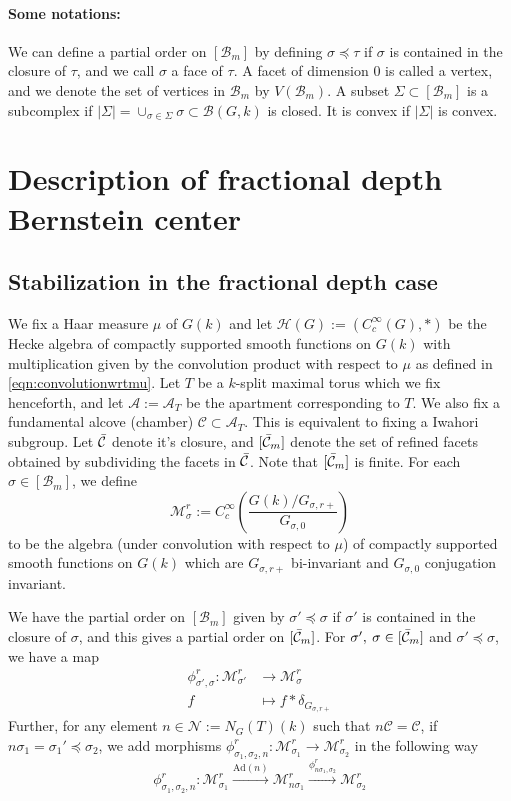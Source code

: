 \documentclass[11 pt]{article}
\numberwithin{equation}{subsection}
\theoremstyle{definition}
\theoremstyle{remark}
\theoremstyle{conjecture}
\newcommand{\sA}{\mathscr A}
\newcommand{\Ad}{\mathrm{Ad}}
\newcommand{\HH}{\mathcal H}
\newcommand{\A}{\mathcal A}
\newcommand{\M}{\mathcal{M}}
\newcommand{\B}{\mathcal{B}}
\newcommand{\mc}{\mathcal}
\newcommand{\mcC}{\mathcal C}
\begin{document}
\paragraph{Some notations:} We can define a partial order on $[\B_m]$ by defining $\sigma \preceq \tau$ if $\sigma $ is contained in the closure of $\tau$, and we call $\sigma$ a face of $\tau$. A facet of dimension $0$ is called a vertex, and we denote the set of vertices in $\B_m$ by $V(\B_m)$. A subset $\Sigma \subset [\B_m]$ is a subcomplex if $|\Sigma|=\cup_{\sigma \in \Sigma}\sigma \subset \B(G,k)$ is closed. It is convex if $|\Sigma|$ is convex.

 
\section{Description of fractional depth Bernstein center }\label{section:fracdepthdescription}
\subsection{Stabilization in the fractional depth case}
 
We fix a Haar measure $\mu$ of $G(k)$ and let $\HH(G):=(C_c^\infty(G),*)$ be the Hecke algebra of compactly supported smooth functions on $G(k)$ with multiplication given by the convolution product with respect to $\mu $ as defined in \eqref{eqn:convolutionwrtmu}. Let $T$ be a $k$-split maximal torus which we fix henceforth, and let $\sA:=\A_T$ be the apartment corresponding to $T$. We also fix a fundamental alcove (chamber) $\mcC \subset \mc A_T$. This is equivalent to fixing a Iwahori subgroup. Let $\Bar{\mcC}$ denote it's closure, and $[\Bar{\mcC}_m]$ denote the set of refined facets obtained by subdividing the facets in $\Bar{\mcC}$. Note that $[\Bar{\mcC}_m]$ is finite. For each $\sigma \in [\B_m]$, we define 
\[
\M_\sigma^r:=C_c^\infty\left(\frac{G(k)/G_{\sigma,r+}}{G_{\sigma,0}}\right)
\]
to be the algebra (under convolution with respect to $\mu$) of compactly supported smooth functions on $G(k)$ which are $G_{\sigma,r+}$ bi-invariant and ${G_{\sigma,0}}$ conjugation invariant. \par
We have the partial order on $[\B_m]$ given by $\sigma' \preceq \sigma $ if $\sigma'$ is contained in the closure of $\sigma$, and this gives a partial order on $[\Bar{\mcC}_m]$. For $\sigma',\:\sigma\in [\Bar{\mcC}_m] $ and $\sigma' \preceq \sigma $, we have a map 
\begin{align*}
\phi^r_{\sigma',\sigma}:\M^r_{\sigma'} &\longrightarrow \M^r_{\sigma}\\
f &\longmapsto f*\delta_{G_{\sigma , r+}}  
\end{align*}
Further, for any element $n\in \mc N:=N_G(T)(k)$ such that $n\mcC=\mcC$, if $n\sigma_1=\sigma_1'\preceq \sigma_2$, we add morphisms $\phi^r_{\sigma_1,\sigma_2,n}:\M^r_{\sigma_1} \longrightarrow \M^r_{\sigma_2}$ in the following way
\[
\phi^r_{\sigma_1,\sigma_2,n}:\M^r_{\sigma_1} \xrightarrow[]{\Ad(n)} \M^r_{n\sigma_1}\xrightarrow[]{\phi^r_{n\sigma_1,\sigma_2}}\M^r_{\sigma_2} 
\]
\end{document}
